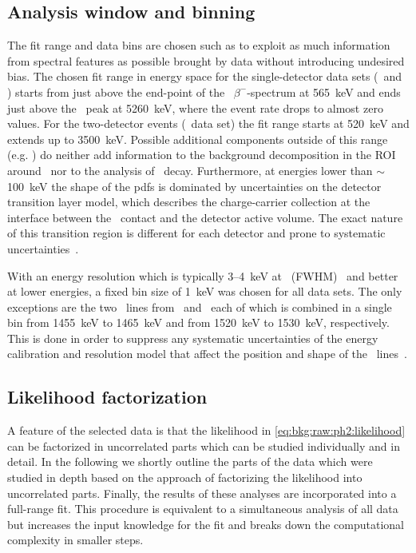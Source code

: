 \subsection{Analysis window and binning}

The fit range and data bins are chosen such as to exploit as much information from
spectral features as possible brought by data without introducing undesired bias. The
chosen fit range in energy space for the single-detector data sets (\enrBEGeII\ and
\enrCoaxII) starts from just above the end-point of the \Arl\ $\beta^-$-spectrum at
565~keV and ends just above the \Po\ peak at 5260~keV, where the event rate drops to
almost zero values. For the two-detector events (\enrGeII\ data set) the fit range starts
at 520~keV and extends up to 3500~keV. Possible additional components outside of this
range (e.g. \Arl) do neither add information to the background decomposition in the ROI
around \qbb\ nor to the analysis of \nnbb\ decay. Furthermore, at energies lower than
$\sim$100~keV the shape of the pdfs is dominated by uncertainties on the detector
transition layer model, which describes the charge-carrier collection at the interface
between the \nplus\ contact and the detector active volume. The exact nature of this
transition region is different for each detector and prone to systematic
uncertainties~\cite{Lehnert2016}.

With an energy resolution which is typically 3--4~keV at \qbb\ (FWHM)~\cite{Agostini2018,
Agostini2019a} and better at lower energies, a fixed bin size of 1~keV was chosen for all
data sets. The only exceptions are the two \g\ lines from \kvn\ and \kvz\ each of which is
combined in a single bin from 1455~keV to 1465~keV and from 1520~keV to 1530~keV,
respectively. This is done in order to suppress any systematic uncertainties of the energy
calibration and resolution model that affect the position and shape of the \g\
lines~\cite{Agostini2019}.

\subsection{Likelihood factorization}%
\label{sec:bkg:raw:ph2:likelihoodfact}

A feature of the selected data is that the likelihood in
\cref{eq:bkg:raw:ph2:likelihood} can be factorized in uncorrelated parts which can be
studied individually and in detail. In the following we shortly outline the parts of the
data which were studied in depth based on the approach of factorizing the likelihood into
uncorrelated parts. Finally, the results of these analyses are incorporated into a
full-range fit. This procedure is equivalent to a simultaneous analysis of all data but
increases the input knowledge for the fit and breaks down the computational complexity in
smaller steps.

